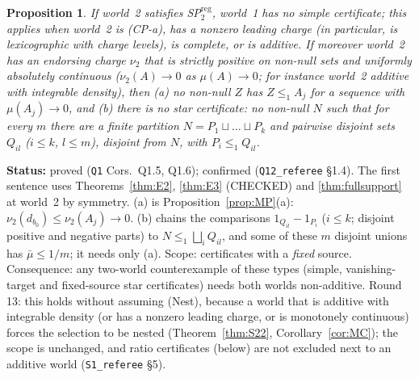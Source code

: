 \documentclass[11pt]{article}
\newtheorem{proposition}[theorem]{Proposition}
\theoremstyle{definition}
\theoremstyle{remark}
\newcommand{\src}[1]{\texttt{#1}}
\newcommand{\status}[1]{\par\smallskip\noindent\textbf{Status:} #1\par\smallskip}
\begin{document}
\begin{proposition}\label{prop:Q15}
If world~2 satisfies SP$^{\mathrm{reg}}_2$, world~1 has no simple certificate; this applies when world~2 is (CP-a), has a nonzero leading charge (in particular, is lexicographic with charge levels), is complete, or is additive. If moreover world~2 has an endorsing charge $\nu_2$ that is strictly positive on non-null sets and uniformly absolutely continuous ($\nu_2(A)\to0$ as $\mu(A)\to0$; for instance world~2 additive with integrable density), then (a) no non-null $Z$ has $Z\le_1A_j$ for a sequence with $\mu(A_j)\to0$, and (b) there is no \emph{star certificate}: no non-null $N$ such that for every $m$ there are a finite partition $N=P_1\sqcup\dots\sqcup P_k$ and pairwise disjoint sets $Q_{il}$ ($i\le k$, $l\le m$), disjoint from $N$, with $P_i\le_1Q_{il}$.
\end{proposition}
\status{proved (\src{Q1} Cors.~Q1.5, Q1.6); confirmed (\src{Q12\_referee} \S1.4). The first sentence uses Theorems~\ref{thm:E2}, \ref{thm:E3} (CHECKED) and \ref{thm:fullsupport} at world~2 by symmetry. (a) is Proposition~\ref{prop:MP}(a): $\nu_2(d_{b_0})\le\nu_2(A_j)\to0$. (b) chains the comparisons $1_{Q_{il}}-1_{P_i}$ ($i\le k$; disjoint positive and negative parts) to $N\le_1\bigsqcup_iQ_{il}$, and some of these $m$ disjoint unions has $\bar\mu\le1/m$; it needs only (a). Scope: certificates with a \emph{fixed} source. Consequence: any two-world counterexample of these types (simple, vanishing-target and fixed-source star certificates) needs both worlds non-additive. Round 13: this holds without assuming (Nest), because a world that is additive with integrable density (or has a nonzero leading charge, or is monotonely continuous) forces the selection to be nested (Theorem~\ref{thm:S22}, Corollary~\ref{cor:MC}); the scope is unchanged, and ratio certificates (below) are not excluded next to an additive world (\src{S1\_referee} \S5).}
\end{document}
